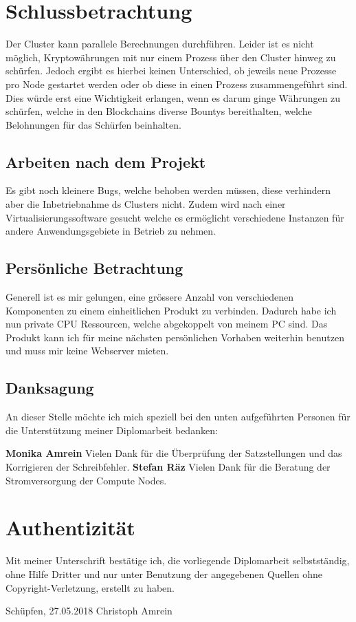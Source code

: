 \section{Schlussbetrachtung} 
\label{sec:Schlussbetrachtung}
Der Cluster kann parallele Berechnungen durchführen. Leider ist es nicht möglich, Kryptowährungen mit nur einem Prozess über den Cluster hinweg zu schürfen. Jedoch ergibt es hierbei keinen Unterschied, ob jeweils neue Prozesse pro Node gestartet werden oder ob diese in einen Prozess zusammengeführt sind. Dies würde erst eine Wichtigkeit erlangen, wenn es darum ginge Währungen zu schürfen, welche in den Blockchains diverse Bountys bereithalten, welche Belohnungen für das Schürfen beinhalten.

\subsection{Arbeiten nach dem Projekt}
Es gibt noch kleinere Bugs, welche behoben werden müssen, diese verhindern aber die Inbetriebnahme ds Clusters nicht. Zudem wird nach einer Virtualisierungssoftware gesucht welche es ermöglicht verschiedene Instanzen für andere Anwendungsgebiete in Betrieb zu nehmen.

\subsection{Persönliche Betrachtung}
Generell ist es mir gelungen, eine grössere Anzahl von verschiedenen Komponenten zu einem einheitlichen Produkt zu verbinden. Dadurch habe ich nun private CPU Ressourcen, welche abgekoppelt von meinem PC sind. Das Produkt kann ich für meine nächsten persönlichen Vorhaben weiterhin benutzen und muss mir keine Webserver mieten.
 
\subsection{Danksagung}
An dieser Stelle möchte ich mich speziell bei den unten aufgeführten Personen für die Unterstützung meiner Diplomarbeit bedanken:

\textbf{Monika Amrein}\newline
Vielen Dank für die Überprüfung der Satzstellungen und das Korrigieren der Schreibfehler.\newline
\textbf{Stefan Räz}\newline
Vielen Dank für die Beratung der Stromversorgung der Compute Nodes.


\section{Authentizität}
Mit meiner Unterschrift bestätige ich, die vorliegende Diplomarbeit selbstständig, ohne Hilfe Dritter und nur unter Benutzung der angegebenen Quellen ohne Copyright-Verletzung, erstellt zu haben.

Schüpfen, 27.05.2018\newline
\newline
\newline
Christoph Amrein

